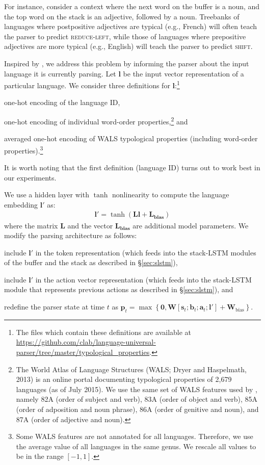 \documentclass[11pt]{article}
\newenvironment{itemizesquish}{\begin{list}{\labelitemi}{\setlength{\itemsep}{0em}\setlength{\labelwidth}{0.5em}\setlength{\leftmargin}{\labelwidth}\addtolength{\leftmargin}{\labelsep}}}{\end{list}}
\begin{document}
For instance, consider a context where the next word on the buffer is a noun, and the top word on the stack is an adjective, followed by a noun.
Treebanks of languages where postpositive adjectives are typical (e.g., French) will often teach the parser to predict \textsc{reduce-left}, while those of languages where prepositive adjectives are more typical (e.g., English) will teach the parser to predict \textsc{shift}.

Inspired by ,
we address this problem by informing the parser about the input language it is currently parsing.  
Let $\mathbf{l}$ be the input vector representation of a particular language.
We consider three definitions for $\mathbf{l}$:\footnote{The files which contain these definitions are available at \url{https://github.com/clab/language-universal-parser/tree/master/typological_properties}.}
\begin{itemizesquish}
\item one-hot encoding of the language ID,
\item one-hot encoding of individual word-order properties,\footnote{The World Atlas of Language Structures (WALS; Dryer and Haspelmath, 2013) \nocite{dryer:13} is an online portal documenting typological properties of 2,679 languages (as of July 2015). We use the same set of WALS features used by , namely 82A (order of subject and verb), 83A (order of object and verb), 85A (order of adposition and noun phrase), 86A (order of genitive and noun), and 87A (order of adjective and noun).} and 
\item averaged one-hot encoding of WALS typological properties (including word-order properties).\footnote{Some WALS features are not annotated for all languages. Therefore, we use the average value of all languages in the same genus. We rescale all values to be in the range $[-1, 1]$.}
\end{itemizesquish}

It is worth noting that the first definition (language ID) turns out to work best in our experiments.

We use a hidden layer with $\tanh$ nonlinearity to compute the language embedding $\mathbf{l'}$ as:
\begin{align}
\mathbf{l'} = \tanh(\mathbf{L l + L_{\text{bias}}}) \nonumber
\end{align}
where the matrix $\mathbf{L}$ and the vector $\mathbf{L_{\text{bias}}}$ are additional model parameters.
We modify the parsing architecture as follows:
\begin{itemizesquish}
\item include $\mathbf{l'}$ in the token representation (which feeds into the stack-LSTM modules of the buffer and the stack as described in \S\ref{sec:slstm}),
\item include $\mathbf{l'}$ in the action vector representation (which feeds into the stack-LSTM module that represents previous actions as described in \S\ref{sec:slstm}), and
\item redefine the parser state at time $t$ as $\mathbf{p}_t = \max\left\{ \boldsymbol{0}, \mathbf{W}[\mathbf{s}_t; \mathbf{b}_t; \mathbf{a}_t; \mathbf{l'}] + \mathbf{W}_{\text{bias}}\right\}$.
\end{itemizesquish}
\end{document}
